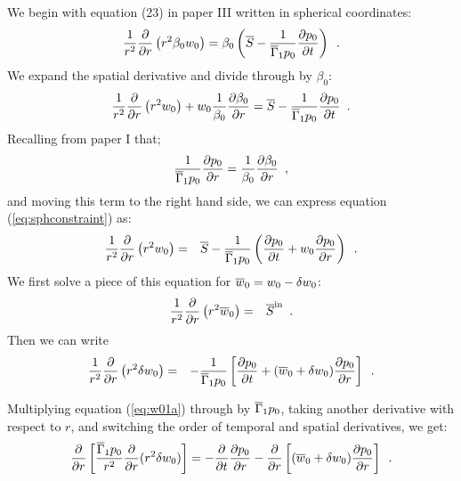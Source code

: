 \begin{enumerate}
\begin{description}
We begin with equation (23) in paper III written in spherical coordinates:
\begin{equation}
\frac{1}{r^2}\frac{\partial}{\partial r} \left (r^2 \beta_0 w_0 \right ) =
\beta_0 \left ( \overline{S} - \frac{1}{\overline{\Gamma}_1 p_0} \frac{\partial p_0}{\partial t} \right )\enskip.
\end{equation}
We expand the spatial derivative and divide through by $\beta_0$:
\begin{equation}
\label{eq:sphconstraint}
\frac{1}{r^2} \frac{\partial}{\partial r} \left (r^2 w_0 \right ) +
w_0 \frac{1}{\beta_0} \frac{\partial \beta_0}{\partial r} =
 \overline{S} - \frac{1}{\overline{\Gamma}_1 p_0} \frac{\partial p_0}{\partial t}  \enskip .
\end{equation}
Recalling from paper I that;
\begin{equation}
\frac{1}{\overline{\Gamma}_1 p_0}  \frac{\partial p_0}{\partial r} = \frac{1}{\beta_0} \frac{\partial \beta_0}{\partial r}\enskip,
\end{equation}
and moving this term to the right hand side,
we can express equation (\ref{eq:sphconstraint}) as:
\begin{eqnarray}
\frac{1}{r^2} \frac{\partial}{\partial r} \left (r^2 w_0 \right ) &=&
  \overline{S} - \frac{1}{\overline{\Gamma}_1 p_0} \left( 
\frac{\partial p_0}{\partial t} + w_0 \frac{\partial p_0}{\partial r} \right)\enskip. \label{eq:w01}
\end{eqnarray}
We first solve a piece of this equation for $\overline{w}_0 = w_0 - \delta w_0$:
\begin{eqnarray}
\frac{1}{r^2} \frac{\partial}{\partial r} \left (r^2 \overline{w}_0 \right ) &=& \overline{S}^{\mathrm{in}} \enskip.
\end{eqnarray}
Then we can write
\begin{eqnarray}
\frac{1}{r^2} \frac{\partial}{\partial r} \left (r^2 \delta w_0 \right ) &=&
  - \frac{1}{\overline{\Gamma}_1 p_0} \left[
\frac{\partial p_0}{\partial t} + (\overline{w}_0 + \delta w_0)
\frac{\partial p_0}{\partial r} \right]\enskip.\label{eq:w01a}
\end{eqnarray}

Multiplying equation (\ref{eq:w01a}) through by $\overline{\Gamma}_1 p_0 $,
taking another derivative with respect to $r$, and switching the order
of temporal and spatial derivatives, we get:
\begin{equation}
\label{eq:sphconstraint_2}
\frac{\partial}{\partial r} \left [ \frac{\overline{\Gamma}_1 p_0 }{r^2} \frac{\partial}{\partial r} (r^2 \delta w_0) \right ]
= -\frac{\partial}{\partial t} \frac{\partial p_0}{\partial r}
  -\frac{\partial}{\partial r} \left [(\overline{w}_0+\delta w_0) \frac{\partial p_0}{\partial r} \right ]\enskip.
\end{equation}


\end{description}
\end{enumerate}
